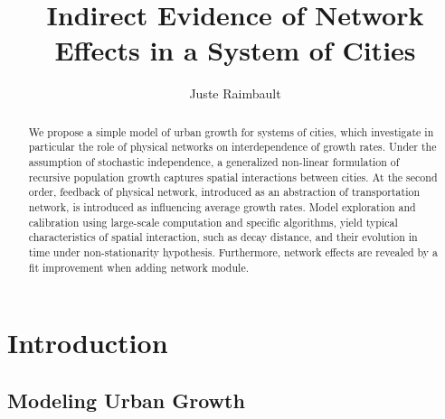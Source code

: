 \documentclass[Royal,sageh,times]{sagej}
\begin{document}

\title{Indirect Evidence of Network Effects in a System of Cities}

\author{Juste Raimbault}




\begin{abstract}
We propose a simple model of urban growth for systems of cities, which investigate in particular the role of physical networks on interdependence of growth rates. Under the assumption of stochastic independence, a generalized non-linear formulation of recursive population growth captures spatial interactions between cities. At the second order, feedback of physical network, introduced as an abstraction of transportation network, is introduced as influencing average growth rates. Model exploration and calibration using large-scale computation and specific algorithms, yield typical characteristics of spatial interaction, such as decay distance, and their evolution in time under non-stationarity hypothesis. Furthermore, network effects are revealed by a fit improvement when adding network module.
\end{abstract}


\maketitle






\section{Introduction}

\subsection{Modeling Urban Growth}
\end{document}

